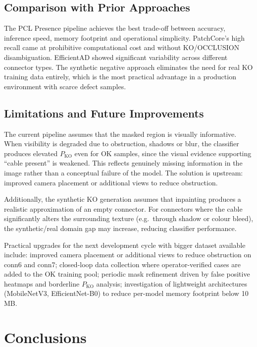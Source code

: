 \documentclass[11pt,a4paper]{article}
\begin{document}
\subsection{Comparison with Prior Approaches}

The PCL Presence pipeline achieves the best trade-off between accuracy, inference speed, memory footprint and operational simplicity. PatchCore's high recall came at prohibitive computational cost and without KO/OCCLUSION disambiguation. EfficientAD showed significant variability across different connector types. The synthetic negative approach eliminates the need for real KO training data entirely, which is the most practical advantage in a production environment with scarce defect samples.

\subsection{Limitations and Future Improvements}

The current pipeline assumes that the masked region is visually informative. When visibility is degraded due to obstruction, shadows or blur, the classifier produces elevated $P_{\mathrm{KO}}$ even for OK samples, since the visual evidence supporting ``cable present'' is weakened. This reflects genuinely missing information in the image rather than a conceptual failure of the model. The solution is upstream: improved camera placement or additional views to reduce obstruction.

Additionally, the synthetic KO generation assumes that inpainting produces a realistic approximation of an empty connector. For connectors where the cable significantly alters the surrounding texture (e.g.\ through shadow or colour bleed), the synthetic/real domain gap may increase, reducing classifier performance.

Practical upgrades for the next development cycle with bigger dataset available include: improved camera placement or additional views to reduce obstruction on conn6 and conn7; closed-loop data collection where operator-verified cases are added to the OK training pool; periodic mask refinement driven by false positive heatmaps and borderline $P_{\mathrm{KO}}$ analysis; investigation of lightweight architectures (MobileNetV3, EfficientNet-B0) to reduce per-model memory footprint below 10\,MB.

\section{Conclusions}
\end{document}
